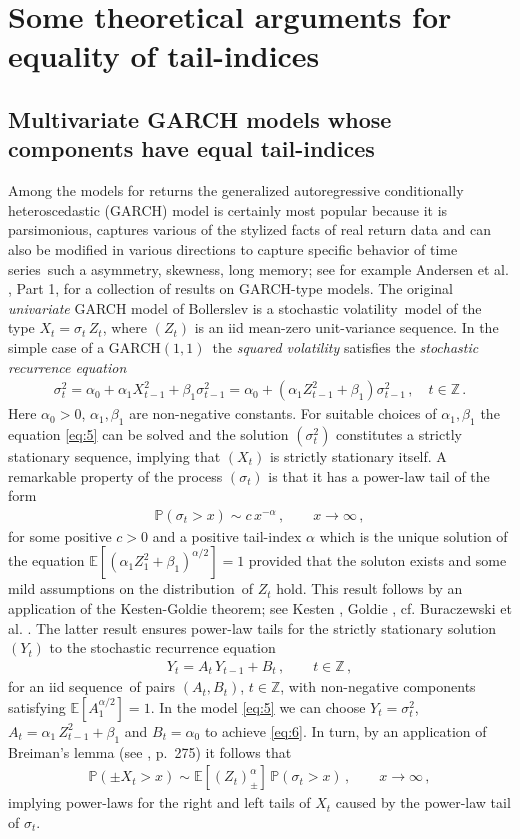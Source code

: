 \documentclass[11pt,a4]{amsart}
\newcommand{\garch}{{\rm GARCH}$(1,1)$}
\newcommand{\ts}{time series}
\newcommand{\sv}{stochastic volatility}
\newcommand{\sre}{stochastic recurrence equation}
\newcommand{\beao}{\begin{eqnarray*}}
\newcommand{\eeao}{\end{eqnarray*}\noindent}
\newcommand{\beam}{\begin{eqnarray}}
\newcommand{\eeam}{\end{eqnarray}\noindent}
\newcommand{\xto}{x\to\infty}
\newcommand{\bbz}{{\mathbb Z}}
\newcommand{\ds}{distribution}
\newcommand{\seq}{sequence}
\newcommand{\E }{{\mathbb E}}
\renewcommand{\P }{{\mathbb P}}
\newcommand{\1}{{\mathbf 1}}
\begin{document}
\newpage
\section{Some theoretical arguments for equality of tail-indices}\setcounter{equation}{0}\label{sec:2}
\subsection{Multivariate GARCH models whose components have  equal tail-indices}\label{subsec:garch}
Among the models for returns the generalized autoregressive conditionally heteroscedastic (GARCH) model
is certainly most popular because it is parsimonious, captures various of the stylized facts of real return data
and can also be modified in various directions to capture specific behavior of \ts\ such a asymmetry, skewness, long memory; 
see for example Andersen et al. \cite{andersen:davis:kreiss:mikosch:2009}, Part 1, for a collection of results
on GARCH-type models.
The original  {\em univariate} GARCH model of Bollerslev \cite{bollerslev:1986} is a \sv\ model of the type $X_t=\sigma_t\,Z_t$, where 
$(Z_t)$ is an iid mean-zero unit-variance \seq . In the simple case of a \garch\ the {\em squared volatility} satisfies the {\em \sre} 
\beam\label{eq:5}
\sigma_t^2= \alpha_0+\alpha_1 X_{t-1}^2+\beta_1\sigma_{t-1}^2=\alpha_0+(\alpha_1Z_{t-1}^2+\beta_1)\sigma_{t-1}^2\,,\quad t\in\bbz\,.
\eeam
Here $\alpha_0>0$, $\alpha_1,\beta_1$ are non-negative constants. For suitable choices of $\alpha_1,\beta_1$ the equation \eqref{eq:5}
can be solved and the solution $(\sigma_t^2)$ constitutes a strictly stationary \seq , implying that $(X_t)$ 
is strictly stationary itself. A remarkable property of the process $(\sigma_t)$ is that it has a power-law tail 
of the form
\beam\label{eq:6}
\P(\sigma_t>x)\sim c\,x^{-\alpha}\,,\qquad \xto\,,
\eeam
for some positive $c>0$ and a positive tail-index $\alpha$ which is the unique solution of the equation 
$\E [(\alpha_1 Z_1^2+\beta_1)^{\alpha/2}]=1$
provided that the soluton exists and some mild assumptions on the \ds\ of $Z_t$ hold. This result
follows by an application of the Kesten-Goldie theorem; see Kesten \cite{kesten:1973}, Goldie \cite{goldie:1991}, cf. 
Buraczewski et al. \cite{buraczewski:damek:mikosch:2016}. The latter result ensures power-law tails  for
the strictly stationary  solution $(Y_t)$ to the \sre\ 
\beam\label{eq:7}
Y_t= A_t\,Y_{t-1}+B_t\,,\qquad t\in\bbz\,,
\eeam
for an iid \seq\ of pairs $(A_t,B_t)$, $t\in\bbz$, with non-negative components satisfying $\E [A_1^{\alpha/2}]=1$.  
In the model \eqref{eq:5} we can choose $Y_t=\sigma_t^2$, $A_t=\alpha_1\,Z_{t-1}^2+\beta_1$ and $B_t=\alpha_0$ to achieve
\eqref{eq:6}. In turn, by an application of Breiman's lemma (see \cite{buraczewski:damek:mikosch:2016}, p.~275)
it follows that
\beao
\P(\pm X_t>x)\sim \E[(Z_t)_\pm^\alpha]\,\P(\sigma_t>x)\,,\qquad \xto\,, 
\eeao
implying power-laws for the right and left tails of $X_t$ caused by the power-law tail of $\sigma_t$.
\end{document}
